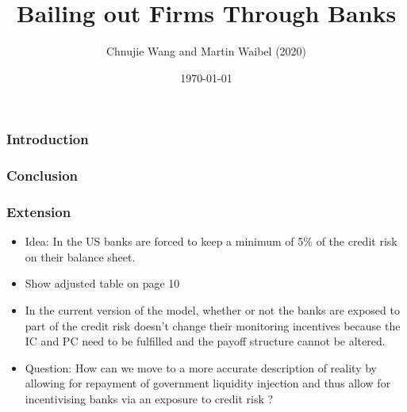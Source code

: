 \documentclass{beamer}
\begin{document}
	
\title{Bailing out Firms Through Banks}
\author{Chnujie Wang and Martin Waibel (2020)}
\date{\today}

 \renewcommand*\inserttotalframenumber{14	}

\begin{frame}
\maketitle
\end{frame}


\begin{frame}
\frametitle{Introduction}
\end{frame}

\begin{frame}
\frametitle{Conclusion}
\end{frame}

\begin{frame}
\frametitle{Extension}
\begin{itemize}
	\item Idea: In the US banks are forced to keep a minimum of 5\% of the credit risk on their balance sheet. 

	\item Show adjusted table on page 10 

	\item In the current version of the model, whether or not the banks are exposed to part of the credit risk doesn't change their monitoring incentives because the IC and PC need to be fulfilled and the payoff structure cannot be altered. 

	\item Question: How can we move to a more accurate description of reality by allowing for repayment of government liquidity injection and thus allow for incentivising banks via an exposure to credit risk ?

\end{itemize}

\end{frame}
\end{document}
